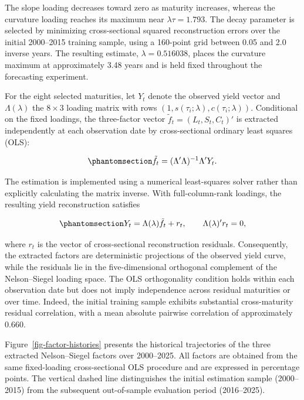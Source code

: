 \documentclass[
  12pt,
  letterpaper,
  DIV=11,
  numbers=noendperiod]{scrreprt}
\begin{document}
The slope loading decreases toward zero as maturity increases, whereas
the curvature loading reaches its maximum near \(\lambda\tau=1.793\).
The decay parameter is selected by minimizing cross-sectional squared
reconstruction errors over the initial 2000--2015 training sample, using
a 160-point grid between 0.05 and 2.0 inverse years. The resulting
estimate, \(\lambda=0.516038\), places the curvature maximum at
approximately 3.48 years and is held fixed throughout the forecasting
experiment.

For the eight selected maturities, let \(Y_t\) denote the observed yield
vector and \(\Lambda(\lambda)\) the \(8\times3\) loading matrix with
rows \((1,s(\tau_i;\lambda),c(\tau_i;\lambda))\). Conditional on the
fixed loadings, the three-factor vector \(\tilde f_t=(L_t,S_t,C_t)'\) is
extracted independently at each observation date by cross-sectional
ordinary least squares (OLS):

\begin{equation}\protect\phantomsection\label{eq-extraction}{
\tilde f_t=(\Lambda'\Lambda)^{-1}\Lambda'Y_t.
}\end{equation}

The estimation is implemented using a numerical least-squares solver
rather than explicitly calculating the matrix inverse. With
full-column-rank loadings, the resulting yield reconstruction satisfies

\begin{equation}\protect\phantomsection\label{eq-observation}{
Y_t=\Lambda(\lambda)\tilde f_t+r_t,
\qquad
\Lambda(\lambda)'r_t=0,
}\end{equation}

where \(r_t\) is the vector of cross-sectional reconstruction residuals.
Consequently, the extracted factors are deterministic projections of the
observed yield curve, while the residuals lie in the five-dimensional
orthogonal complement of the Nelson--Siegel loading space. The OLS
orthogonality condition holds within each observation date but does not
imply independence across residual maturities or over time. Indeed, the
initial training sample exhibits substantial cross-maturity residual
correlation, with a mean absolute pairwise correlation of approximately
0.660.

Figure~\ref{fig-factor-histories} presents the historical trajectories
of the three extracted Nelson--Siegel factors over 2000--2025. All
factors are obtained from the same fixed-loading cross-sectional OLS
procedure and are expressed in percentage points. The vertical dashed
line distinguishes the initial estimation sample (2000--2015) from the
subsequent out-of-sample evaluation period (2016--2025).
\end{document}
